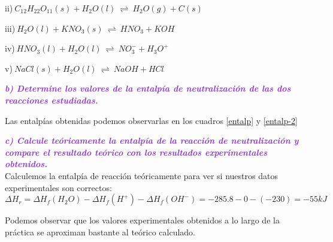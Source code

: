     ii)$~ C_{12}H_{22}O_{11}(s) + H_2O(l) ~\rightleftharpoons ~ H_2O(g) + C(s)$
    
    \vspace{0.2cm}
    
    iii)$~ H_2O(l) + KNO_3(s) ~\rightleftharpoons ~ HNO_3 + KOH$
    
    \vspace{0.2cm}
    
    iv)$~ HNO_3(l) + H_2O(l) ~\rightleftharpoons ~ NO_3^- + H_3O^+$
    
    \vspace{0.2cm}
    
    v)$~ NaCl(s) + H_2O(l) ~\rightleftharpoons ~ NaOH + HCl$\\
    
    \vspace{0.3cm}

\noindent\textcolor{BlueViolet}{\textbf{\textit{b) Determine los valores de la entalpía de neutralización de las dos reacciones
estudiadas.}}}\\

    \vspace{0.2cm}
    
    Las entalpías obtenidas podemos observarlas en los cuadros \ref{entalp} y \ref{entalp-2}\\
    
    \vspace{0.4cm}

\noindent\textcolor{BlueViolet}{\textbf{\textit{c) Calcule teóricamente la entalpía de la reacción de neutralización y compare el
resultado teórico con los resultados experimentales obtenidos.}}}\\

 Calculemos la entalpía de reacción teóricamente para ver si nuestros datos experimentales son correctos:\\
\[\Delta{H_{r}} = \Delta{H_{f}(H_2O)} - \Delta{H_{f}(H^+)} - \Delta{H_{f}(OH^-)} = -285.8 - 0 - (-230) = -55 kJ\]

 Podemos observar que los valores experimentales obtenidos a lo largo de la práctica se aproximan bastante al teórico calculado.













